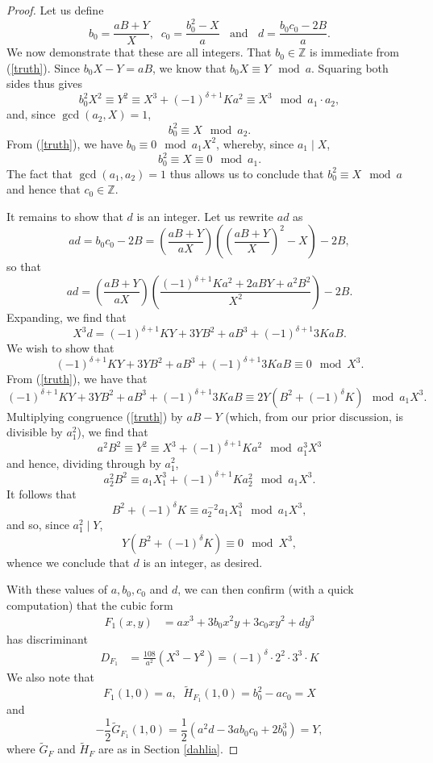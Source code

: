 \begin{proof}
Let us define
\begin{equation} \label{definite}
b_0 = \frac{aB+Y}{X}, \; \; 
c_0 = \frac{b_0^2-X}{a} \; \; \mbox{ and } \; \; 
d = \frac{b_0c_0 - 2B}{a}.
\end{equation}
We now demonstrate that these are all integers. That $b_0 \in \mathbb{Z}$ is immediate from (\ref{truth}).
Since $b_0 X - Y = aB$, we know that $b_0 X \equiv Y \mod{a}$. Squaring both sides 
thus gives 
$$
b_0^2 X^2 \equiv Y^2 \equiv X^3 + (-1)^{\delta+1} K a^2  \equiv X^3 \mod{a_1 \cdot a_2},
$$
and, since $\gcd (a_2,X)=1$,
$$
 b_0^2 \equiv X \mod{a_2}.
$$
From (\ref{truth}), we have $b_0 \equiv 0 \mod{a_1 X^2}$, whereby, since $a_1 \mid X$, 
$$
b_0^2 \equiv X \equiv 0 \mod{a_1}.
$$
The fact that $\gcd(a_1,a_2)=1$ thus allows us to conclude that $b_0^2 \equiv X \mod{a}$ and hence that $c_0 \in \mathbb{Z}$.

It remains to show that $d$ is an integer.
Let us rewrite $ad$ as
$$
ad = b_0c_0-2B = \left( \frac{aB+Y}{aX} \right) \left( \left( \frac{aB+Y}{X} \right)^2 - X \right) - 2B,
$$
so that
$$
ad =\left( \frac{aB+Y}{aX} \right) \left( \frac{(-1)^{\delta+1} K a^2 + 2 a B Y + a^2 B^2}{X^2} \right) - 2B.
$$
Expanding, we find that
\begin{equation} \label{three}
X^3 d = (-1)^{\delta+1} KY+ 3 Y B^2 + a B^3 + (-1)^{\delta+1} 3 KaB.
\end{equation}
We wish to show that
$$
(-1)^{\delta+1} KY+ 3 Y B^2 + a B^3 + (-1)^{\delta+1} 3 KaB \equiv 0 \mod{X^3}.
$$
From (\ref{truth}), we have that
$$
(-1)^{\delta+1} KY+ 3 Y B^2 + a B^3 + (-1)^{\delta+1} 3 KaB \equiv 2Y \left( B^2 + (-1)^\delta K \right) \mod{a_1 X^3}.
$$
Multiplying congruence (\ref{truth}) by $aB-Y$ (which, from our prior discussion, is divisible by $a_1^2$), 
we find that 
$$
a^2 B^2 \equiv Y^2 \equiv X^3 + (-1)^{\delta+1} K a^2 \mod{a_1^3 X^3}
$$
and hence, dividing through by $a_1^2$,
$$
a_2^2 B^2 \equiv  a_1 X_1^3 + (-1)^{\delta+1} K a_2^2 \mod{a_1 X^3}.
$$
It follows that
\begin{equation} \label{three-2}
B^2 + (-1)^\delta K \equiv a_2^{-2} a_1 X_1^3  \mod{a_1 X^3},
\end{equation}
and so, since $a_1^2 \mid Y$, 
$$
Y \left( B^2 + (-1)^\delta K \right) \equiv 0 \mod{X^3},
$$
whence we conclude that $d$ is an integer, as desired.

With these values of $a, b_0, c_0$ and $d$, we can then confirm (with a quick computation) that the cubic form
\begin{align*}
  F_1(x,y) &= ax^3 + 3b_0 x^2y + 3c_0 xy^2 + dy^3
\end{align*}
has discriminant
\begin{align*}
  D_{F_1} &= \frac{108}{a^2} (X^3-Y^2) = (-1)^\delta \cdot 2^2 \cdot 3^3 \cdot K
\end{align*}
We also note that 
$$
F_1(1,0) = a, \; \; \widetilde{H}_{F_1}(1,0) = b_0^2 -a c_0 = X
$$
and
$$
 -\frac{1}{2} \widetilde{G}_{F_1}(1,0) = \frac{1}{2}(a^2d -3ab_0c_0+2b_0^3) = Y,
$$
where $\widetilde{G}_{F}$ and $\widetilde{H}_{F}$ are as in Section \ref{dahlia}.


\end{proof}
